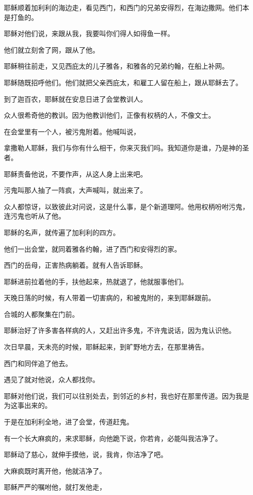 \documentclass[12pt,oneside]{book}
\begin{document}
耶稣顺着加利利的海边走，看见西门，和西门的兄弟安得烈，在海边撒网。他们本是打鱼的。

耶稣对他们说，来跟从我，我要叫你们得人如得鱼一样。

他们就立刻舍了网，跟从了他。

耶稣稍往前走，又见西庇太的儿子雅各，和雅各的兄弟约翰，在船上补网。

耶稣随既招呼他们。他们就把父亲西庇太，和雇工人留在船上，跟从耶稣去了。

到了迦百农，耶稣就在安息日进了会堂教训人。

众人很希奇他的教训。因为他教训他们，正像有权柄的人，不像文士。

在会堂里有一个人，被污鬼附着。他喊叫说，

拿撒勒人耶稣，我们与你有什么相干，你来灭我们吗。我知道你是谁，乃是神的圣者。

耶稣责备他说，不要作声，从这人身上出来吧。

污鬼叫那人抽了一阵疯，大声喊叫，就出来了。

众人都惊讶，以致彼此对问说，这是什么事，是个新道理阿。他用权柄吩咐污鬼，连污鬼也听从了他。

耶稣的名声，就传遍了加利利的四方。

他们一出会堂，就同着雅各约翰，进了西门和安得烈的家。

西门的岳母，正害热病躺着。就有人告诉耶稣。

耶稣进前拉着他的手，扶他起来，热就退了，他就服事他们。

天晚日落的时候，有人带着一切害病的，和被鬼附的，来到耶稣跟前。

合城的人都聚集在门前。

耶稣治好了许多害各样病的人，又赶出许多鬼，不许鬼说话，因为鬼认识他。

次日早晨，天未亮的时候，耶稣起来，到旷野地方去，在那里祷告。

西门和同伴追了他去。

遇见了就对他说，众人都找你。

耶稣对他们说，我们可以往别处去，到邻近的乡村，我也好在那里传道。因为我是为这事出来的。

于是在加利利全地，进了会堂，传道赶鬼。

有一个长大麻疯的，来求耶稣，向他跪下说，你若肯，必能叫我洁净了。

耶稣动了慈心，就伸手摸他，说，我肯，你洁净了吧。

大麻疯既时离开他，他就洁净了。

耶稣严严的嘱咐他，就打发他走，
\end{document}
